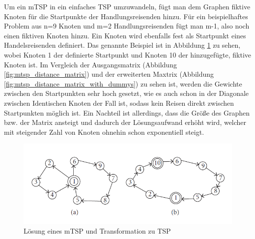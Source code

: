 Um ein mTSP in ein einfaches TSP umzuwandeln, fügt man dem Graphen fiktive Knoten für die Startpunkte der Handlungsreisenden hinzu. Für ein beispielhaftes Problem aus n=9 Knoten und m=2 Handlungsreisenden fügt man m-1, also noch einen fiktiven Knoten hinzu. Ein Knoten wird ebenfalls fest als Startpunkt eines Handelsreisenden definiert. Das genannte Beispiel ist in Abbildung \ref{fig:mtsp_tranformation} zu sehen, wobei Knoten 1 der definierte Startpunkt und Knoten 10 der hinzugefügte, fiktive Knoten ist. Im Vergleich der Ausgangsmatrix (Abbildung \ref{fig:mtsp_distance_matrix}) und der erweiterten Maxtrix (Abbildung \ref{fig:mtsp_distance_matrix_with_dummys}) zu sehen ist, werden die Gewichte zwischen den Startpunkten sehr hoch gesetzt, wie es auch schon in der Diagonale zwischen Identischen Knoten der Fall ist, sodass kein Reisen direkt zwischen Startpunkten möglich ist. Ein Nachteil ist allerdings, dass die Größe des Graphen bzw. der Matrix ansteigt und dadurch der Lösungsaufwand erhöht wird, welcher mit steigender Zahl von Knoten ohnehin schon exponentiell steigt. \cite{mtsp, mtspTransform2}

\begin{figure}[H]
    \centering
    \includegraphics[width=\textwidth]{images/mtspTransformation.png}
    \caption{Lösung eines mTSP und Transformation zu TSP \cite{mtspTransform2}}
    \label{fig:mtsp_tranformation}
\end{figure}

